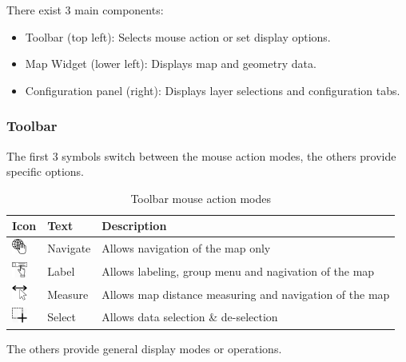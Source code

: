 There exist 3 main components:
\begin{itemize}
 \item Toolbar (top left): Selects mouse action or set display options.
 \item Map Widget (lower left): Displays map and geometry data.
 \item Configuration panel (right): Displays layer selections and configuration tabs.
\end{itemize}

\subsubsection{Toolbar}

The first 3 symbols switch between the mouse action modes, the others provide specific options.

\begin{table}[H]
  \center
  \begin{tabular}{ | l | l | l |}
    \hline
    \textbf{Icon} & \textbf{Text} &  \textbf{Description} \\ \hline
    \includegraphics[width=0.5cm]{../../data/icons/navigate.png} & Navigate & Allows navigation of the map only \\ \hline
    \includegraphics[width=0.5cm]{../../data/icons/label_action.png} & Label & Allows labeling, group menu and nagivation of the map \\ \hline
    \includegraphics[width=0.5cm]{../../data/icons/measure_action.png} & Measure & Allows map distance measuring and navigation of the map \\ \hline
    \includegraphics[width=0.5cm]{../../data/icons/select_action.png} & Select & Allows data selection \& de-selection \\ \hline
  \end{tabular}
  \caption{Toolbar mouse action modes}
\end{table}

The others provide general display modes or operations.

